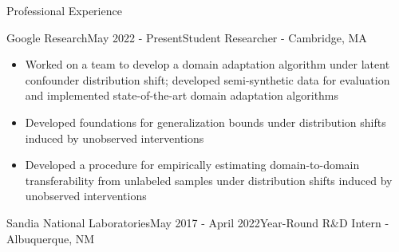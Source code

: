 \documentclass{resume} %
\begin{document}

\begin{rSection}{Professional Experience}
\begin{rSubsection}{Google Research}{May 2022 - Present}{Student Researcher - Cambridge, MA}

\begin{itemize}
    \item Worked on a team to develop a domain adaptation algorithm under latent confounder distribution shift;
    developed semi-synthetic data for evaluation and implemented state-of-the-art domain adaptation algorithms
    \item Developed foundations for generalization bounds under distribution shifts induced 
     by unobserved interventions
    \item Developed a procedure for empirically estimating domain-to-domain transferability from
     unlabeled samples under distribution shifts induced by unobserved interventions
\end{itemize}

\end{rSubsection}

\begin{rSubsection}{Sandia National Laboratories}{May 2017 - April 2022}{Year-Round R\&D Intern - Albuquerque, NM}


\end{rSubsection}
\end{rSection}
\end{document}
